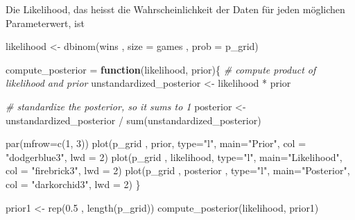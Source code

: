 \documentclass[]{tufte-handout}
\newenvironment{Shaded}{}{}
\newcommand{\AttributeTok}[1]{\textcolor[rgb]{0.49,0.56,0.16}{#1}}
\newcommand{\CommentTok}[1]{\textcolor[rgb]{0.38,0.63,0.69}{\textit{#1}}}
\newcommand{\ControlFlowTok}[1]{\textcolor[rgb]{0.00,0.44,0.13}{\textbf{#1}}}
\newcommand{\DecValTok}[1]{\textcolor[rgb]{0.25,0.63,0.44}{#1}}
\newcommand{\FloatTok}[1]{\textcolor[rgb]{0.25,0.63,0.44}{#1}}
\newcommand{\FunctionTok}[1]{\textcolor[rgb]{0.02,0.16,0.49}{#1}}
\newcommand{\NormalTok}[1]{#1}
\newcommand{\OtherTok}[1]{\textcolor[rgb]{0.00,0.44,0.13}{#1}}
\newcommand{\SpecialCharTok}[1]{\textcolor[rgb]{0.25,0.44,0.63}{#1}}
\newcommand{\StringTok}[1]{\textcolor[rgb]{0.25,0.44,0.63}{#1}}
\begin{document}
Die Likelihood, das heisst die Wahrscheinlichkeit der Daten für jeden
möglichen Parameterwert, ist

\begin{Shaded}
\begin{Highlighting}[]
\NormalTok{likelihood }\OtherTok{\textless{}{-}} \FunctionTok{dbinom}\NormalTok{(wins , }\AttributeTok{size =}\NormalTok{ games , }\AttributeTok{prob =}\NormalTok{ p\_grid)}
\end{Highlighting}
\end{Shaded}

\begin{Shaded}
\begin{Highlighting}[]
\NormalTok{compute\_posterior }\OtherTok{=} \ControlFlowTok{function}\NormalTok{(likelihood, prior)\{}
  \CommentTok{\# compute product of likelihood and prior}
\NormalTok{  unstandardized\_posterior }\OtherTok{\textless{}{-}}\NormalTok{ likelihood }\SpecialCharTok{*}\NormalTok{ prior}
  
  \CommentTok{\# standardize the posterior, so it sums to 1}
\NormalTok{  posterior }\OtherTok{\textless{}{-}}\NormalTok{ unstandardized\_posterior }\SpecialCharTok{/} \FunctionTok{sum}\NormalTok{(unstandardized\_posterior)}
  
  \FunctionTok{par}\NormalTok{(}\AttributeTok{mfrow=}\FunctionTok{c}\NormalTok{(}\DecValTok{1}\NormalTok{, }\DecValTok{3}\NormalTok{))}
  \FunctionTok{plot}\NormalTok{(p\_grid , prior, }\AttributeTok{type=}\StringTok{"l"}\NormalTok{, }\AttributeTok{main=}\StringTok{"Prior"}\NormalTok{, }\AttributeTok{col =} \StringTok{"dodgerblue3"}\NormalTok{, }\AttributeTok{lwd =} \DecValTok{2}\NormalTok{)}
  \FunctionTok{plot}\NormalTok{(p\_grid , likelihood, }\AttributeTok{type=}\StringTok{"l"}\NormalTok{, }\AttributeTok{main=}\StringTok{"Likelihood"}\NormalTok{, }\AttributeTok{col =} \StringTok{"firebrick3"}\NormalTok{, }\AttributeTok{lwd =} \DecValTok{2}\NormalTok{)}
  \FunctionTok{plot}\NormalTok{(p\_grid , posterior , }\AttributeTok{type=}\StringTok{"l"}\NormalTok{, }\AttributeTok{main=}\StringTok{"Posterior"}\NormalTok{, }\AttributeTok{col =} \StringTok{"darkorchid3"}\NormalTok{, }\AttributeTok{lwd =} \DecValTok{2}\NormalTok{)}
\NormalTok{\}}
\end{Highlighting}
\end{Shaded}

\begin{Shaded}
\begin{Highlighting}[]
\NormalTok{prior1 }\OtherTok{\textless{}{-}} \FunctionTok{rep}\NormalTok{(}\FloatTok{0.5}\NormalTok{ , }\FunctionTok{length}\NormalTok{(p\_grid))}
\FunctionTok{compute\_posterior}\NormalTok{(likelihood, prior1)}
\end{Highlighting}
\end{Shaded}
\end{document}
